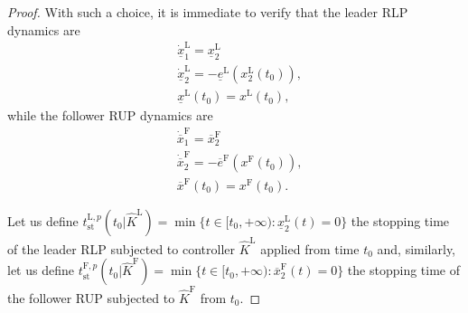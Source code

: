 \begin{theorem}
\begin{proof}
		With such a choice, it is immediate to verify that the  
		leader RLP dynamics are
		\begin{subequations}\label{eq:RLP_dynamics_K_hat}
			\begin{align}
				& \dot{\underline{x}}_1^\mathrm{L}=\underline{x}_2^\mathrm{L} \label{eq:RLP_dynamics_K_hat_dynamics}\\
				& \dot{\underline{x}}_2^\mathrm{L}=-\underline{e}^\mathrm{L}\left(x_2^\mathrm{L}(t_0)\right),\label{eq:RLP_dynamics_K_hat_constraints}\\
				& \underline{x}^\mathrm{L}(t_0)=x^\mathrm{L}(t_0), \label{eq:RLP_dynamics_K_hat_initial}
			\end{align}
		\end{subequations}
		while the follower RUP dynamics are
		\begin{subequations}\label{eq:RUP_dynamics_K_hat}
			\begin{align}
				& \dot{\overline{x}}_1^\mathrm{F}=\overline{x}_2^\mathrm{F} \label{eq:RUP_dynamics_K_hat_dynamics}\\
				& \dot{\overline{x}}_2^\mathrm{F}=-\overline{e}^\mathrm{F}\left(x^\mathrm{F}(t_0)\right),\label{eq:RUP_dynamics_K_hat_constraints}\\
				& \overline{x}^\mathrm{F}(t_0)=x^\mathrm{F}(t_0).
				\label{eq:RUP_dynamics_K_hat_initial}
			\end{align}
		\end{subequations}
		
		Let us define $t_{\mathrm{st}}^{\mathrm{L},p}(t_0 |\hat{K}^\mathrm{L})= \min\{t\in[t_0, +\infty): \underline{x}_2^\mathrm{L}(t)=0\}$ the stopping time of the leader RLP subjected to controller $\hat{K}^\mathrm{L}$ applied from time $t_0$ and, similarly, let us define $t_{\mathrm{st}}^{\mathrm{F},p}(t_0 |\hat{K}^\mathrm{F})= \min\{t\in[t_0, +\infty): \overline{x}_2^\mathrm{F}(t)=0\}$ the stopping time of the follower RUP subjected to $\hat{K}^\mathrm{F}$ from $t_0$. 
		

\end{proof}
\end{theorem}
